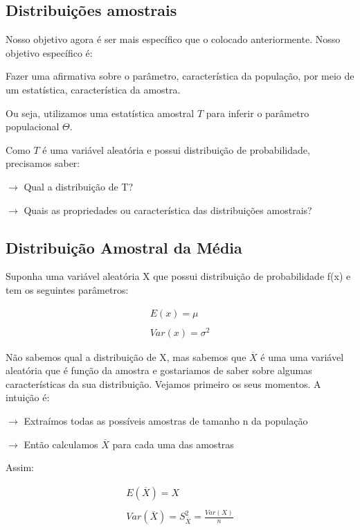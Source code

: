 \documentclass[
  letterpaper,
  DIV=11,
  numbers=noendperiod]{scrartcl}
\begin{document}
\subsection{Distribuições
amostrais}\label{distribuiuxe7uxf5es-amostrais}

Nosso objetivo agora é ser mais específico que o colocado anteriormente.
Nosso objetivo específico é:

\begin{tcolorbox}
Fazer uma afirmativa sobre o parâmetro, característica da população, por meio de um estatística, característica da amostra. 
\end{tcolorbox}

Ou seja, utilizamos uma estatística amostral \(T\) para inferir o
parâmetro populacional \(\Theta\).

Como \(T\) é uma variável aleatória e possui distribuição de
probabilidade, precisamos saber:

\(\rightarrow\) Qual a distribuição de T?

\(\rightarrow\) Quais as propriedades ou característica das
distribuições amostrais?

\subsection{Distribuição Amostral da
Média}\label{distribuiuxe7uxe3o-amostral-da-muxe9dia}

Suponha uma variável aleatória X que possui distribuição de
probabilidade f(x) e tem os seguintes parâmetros:

\[\begin{array}{ccc}
E(x)=\mu 
\\
\\
Var(x)=\sigma^{2}
\end{array}\]

Não sabemos qual a distribuição de X, mas sabemos que \(\overline{X}\) é
uma uma variável aleatória que é função da amostra e gostariamos de
saber sobre algumas características da sua distribuição. Vejamos
primeiro os seus momentos. A intuição é:

\(\rightarrow\) Extraímos todas as possíveis amostras de tamanho n da
população

\(\rightarrow\) Então calculamos \(\overline{X}\) para cada uma das
amostras

Assim:

\[\begin{array}{ccc}
E(\overline{X})=X
\\
\\
Var(\overline{X})=S_{\overline{X}}^{2} = \frac{Var(X)}{n}
\end{array}\]
\end{document}
